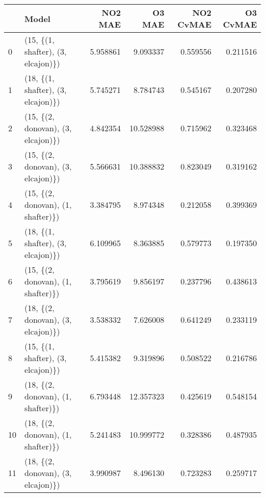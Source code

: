 \begin{tabular}{llrrrr}
\toprule
{} &                               Model &   NO2 MAE &     O3 MAE &  NO2 CvMAE &  O3 CvMAE \\
\midrule
0  &  (15, \{(1, shafter), (3, elcajon)\}) &  5.958861 &   9.093337 &   0.559556 &  0.211516 \\
1  &  (18, \{(1, shafter), (3, elcajon)\}) &  5.745271 &   8.784743 &   0.545167 &  0.207280 \\
2  &  (15, \{(2, donovan), (3, elcajon)\}) &  4.842354 &  10.528988 &   0.715962 &  0.323468 \\
3  &  (15, \{(2, donovan), (3, elcajon)\}) &  5.566631 &  10.388832 &   0.823049 &  0.319162 \\
4  &  (15, \{(2, donovan), (1, shafter)\}) &  3.384795 &   8.974348 &   0.212058 &  0.399369 \\
5  &  (18, \{(1, shafter), (3, elcajon)\}) &  6.109965 &   8.363885 &   0.579773 &  0.197350 \\
6  &  (15, \{(2, donovan), (1, shafter)\}) &  3.795619 &   9.856197 &   0.237796 &  0.438613 \\
7  &  (18, \{(2, donovan), (3, elcajon)\}) &  3.538332 &   7.626008 &   0.641249 &  0.233119 \\
8  &  (15, \{(1, shafter), (3, elcajon)\}) &  5.415382 &   9.319896 &   0.508522 &  0.216786 \\
9  &  (18, \{(2, donovan), (1, shafter)\}) &  6.793448 &  12.357323 &   0.425619 &  0.548154 \\
10 &  (18, \{(2, donovan), (1, shafter)\}) &  5.241483 &  10.999772 &   0.328386 &  0.487935 \\
11 &  (18, \{(2, donovan), (3, elcajon)\}) &  3.990987 &   8.496130 &   0.723283 &  0.259717 \\
\bottomrule
\end{tabular}
